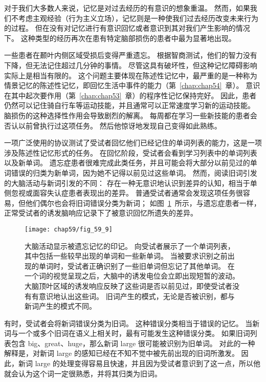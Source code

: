 对于我们大多数人来说，记忆是对过去经历的有意识的想象重温。
然而，如果我们不考虑主观经验（行为主义立场），记忆则是一种使我们过去经历改变未来行为的过程。
但在没有对记忆进行有意识回忆或者意识到其对我们产生影响的情况下。
这种类型的经历再次在患有特定脑部损伤的患者中最为显著地出现。

一些患者在颞叶内侧区域受损后变得严重遗忘。
根据智商测试，他们的智力没有下降，但无法记住超过几分钟的事情。
尽管这具有破坏性，但这种记忆障碍影响实际上是相当有限的。
这个问题主要体现在陈述性记忆中，最严重的是一种称为情景记忆的陈述性记忆，即回忆生活中事件的能力（第~\ref{chap:chap54}~章）。
意识在其中起次要作用（第~\ref{chap:chap53}~章）的程序性记忆保持完好。
因此，患者仍然可以记住骑自行车等运动技能，并且通常可以正常速度学习新的运动技能。
脑损伤的这种选择性作用会导致剧烈的解离。
每周都在学习一些新技能的患者会否认以前曾执行过这项任务。
然后他惊讶地发现自己变得如此熟练。


一项广泛使用的协议测试了受试者回忆他们已经记住的单词列表的能力，这是一项涉及陈述性记忆形式的任务。
在回忆阶段，受试者会看到学习列表中的单词列表以及新单词。
遗忘症患者很难完成此类任务，并且可能会将大部分以前见过的单词错误的归类为新单词，因为她不记得以前见过这些单词。
然而，阅读旧词引发的大脑活动与新词引发的不同：
存在一种无意识地认识到差异的认知，相当于单侧忽视或面容失认症患者表现出的差异。
普通受试者通常会发现这项任务很容易，但他们偶尔也会将旧词错误分类为新词；
如图~\ref{fig:59_9}~所示，与遗忘症患者一样，正常受试者的诱发脑响应记录下了被意识回忆所遗失的差异。


\begin{figure}[htbp]
	\centering
	\texttt{[image: chap59/fig\_59\_9]}
	\caption{大脑活动显示被遗忘记忆的印记。
		向受试者展示了一个单词列表，其中包括一些较早出现的单词和一些新单词。
		当被要求识别之前出现的单词时，受试者正确识别了一些旧单词但忘记了其他单词。
		在一个词的视觉呈现之后，大脑中的诱发电位会立即出现短暂的波动。
		大脑顶叶区域的诱发响应反映了这些词是否以前见过，即使受试者没有有意识地认出这些词。
		旧词产生的模式，无论是否被识别，都与新词产生的模式不同\cite{rugg1998dissociation}。}
	\label{fig:59_9}
\end{figure}


有时，受试者会将新词错误分类为旧词。
这种错误分类相当于错误的记忆。
当新词与一个或多个旧词在语义上相关时，最有可能发生这种错误分类。
如果旧词列表包含 big、great、huge，那么新词 large 很可能被识别为旧单词。
对此的一种解释是，对新词 large 的感知已经在不知不觉中被先前出现的旧词所激发。
因此，新词 large 的处理变得容易且快速，并且因为受试者意识到了这一点，所以他就会认为这个词一定很熟悉，并将其归类为旧词。


